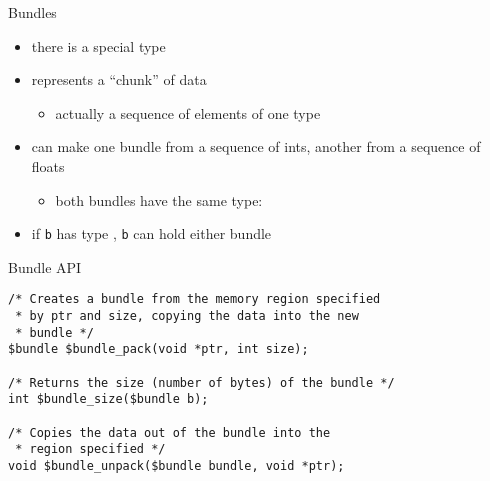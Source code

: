 \documentclass[t]{beamer}
\begin{document}
\begin{frame}{Bundles}
  \begin{itemize}
  \item there is a special \cbundle{} type
  \item represents a ``chunk'' of data
    \begin{itemize}
    \item actually a sequence of elements of one type
    \end{itemize}
  \item can make one bundle from a sequence of ints, another from a
    sequence of floats
    \begin{itemize}
    \item both bundles have the same type: \cbundle
    \end{itemize}
  \item if \texttt{b} has type \cbundle, \texttt{b} can hold either
    bundle
  \end{itemize}
\end{frame}

\begin{frame}[containsverbatim]{Bundle API}
\begin{verbatim}
/* Creates a bundle from the memory region specified
 * by ptr and size, copying the data into the new
 * bundle */
$bundle $bundle_pack(void *ptr, int size);

/* Returns the size (number of bytes) of the bundle */
int $bundle_size($bundle b);

/* Copies the data out of the bundle into the
 * region specified */
void $bundle_unpack($bundle bundle, void *ptr);
\end{verbatim}
\end{frame}
\end{document}
